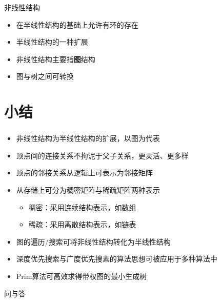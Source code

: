 \begin{frame}
    \begin{block}{非线性结构}
        \begin{itemize}
            \item 在半线性结构的基础上允许有环的存在
            \item 半线性结构的一种扩展
            \item 非线性结构主要指\textbf{图}结构
            \item 图与树之间可转换
        \end{itemize}
    \end{block}
\end{frame}






\section{小结}

\begin{frame}
    \frametitle{\insertsectionhead}
    \begin{itemize}
        \item 非线性结构为半线性结构的扩展，以图为代表
        \item 顶点间的连接关系不拘泥于父子关系，更灵活、更多样
        \item 顶点的邻接关系从\alert{逻辑上}可表示为\alert{邻接矩阵}
        \item 从\alert{存储上}可分为\alert{稠密}矩阵与\alert{稀疏}矩阵两种表示
              \begin{itemize}
                  \item 稠密：采用连续结构表示，如数组
                  \item 稀疏：采用离散结构表示，如链表
              \end{itemize}
        \item 图的遍历/搜索可将\alert{非}线性结构转化为\alert{半}线性结构
        \item 深度优先搜索与广度优先搜素的算法思想可被应用于多种算法中
        \item Prim算法可高效求得带权图的最小生成树
    \end{itemize}
\end{frame}

\begin{standout}[]
    问与答
\end{standout}